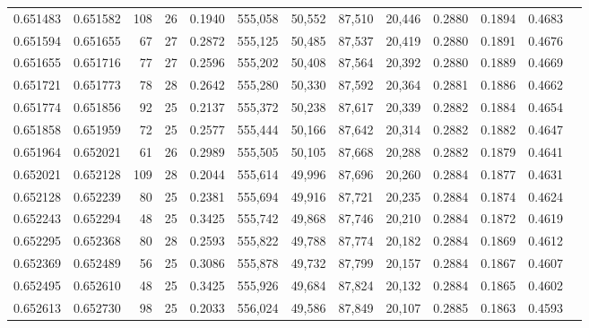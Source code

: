 \begin{tabular}{rrrrrrrrrrrrr}
0.651483 & 0.651582 & 108 &  26 &                                     0.1940 & 555,058 &  50,552 &  87,510 &  20,446 & 0.2880 & 0.1894 & 0.4683 \\
0.651594 & 0.651655 &  67 &  27 &                                     0.2872 & 555,125 &  50,485 &  87,537 &  20,419 & 0.2880 & 0.1891 & 0.4676 \\
0.651655 & 0.651716 &  77 &  27 &                                     0.2596 & 555,202 &  50,408 &  87,564 &  20,392 & 0.2880 & 0.1889 & 0.4669 \\
0.651721 & 0.651773 &  78 &  28 &                                     0.2642 & 555,280 &  50,330 &  87,592 &  20,364 & 0.2881 & 0.1886 & 0.4662 \\
0.651774 & 0.651856 &  92 &  25 &                                     0.2137 & 555,372 &  50,238 &  87,617 &  20,339 & 0.2882 & 0.1884 & 0.4654 \\
0.651858 & 0.651959 &  72 &  25 &                                     0.2577 & 555,444 &  50,166 &  87,642 &  20,314 & 0.2882 & 0.1882 & 0.4647 \\
0.651964 & 0.652021 &  61 &  26 &                                     0.2989 & 555,505 &  50,105 &  87,668 &  20,288 & 0.2882 & 0.1879 & 0.4641 \\
0.652021 & 0.652128 & 109 &  28 &                                     0.2044 & 555,614 &  49,996 &  87,696 &  20,260 & 0.2884 & 0.1877 & 0.4631 \\
0.652128 & 0.652239 &  80 &  25 &                                     0.2381 & 555,694 &  49,916 &  87,721 &  20,235 & 0.2884 & 0.1874 & 0.4624 \\
0.652243 & 0.652294 &  48 &  25 &                                     0.3425 & 555,742 &  49,868 &  87,746 &  20,210 & 0.2884 & 0.1872 & 0.4619 \\
0.652295 & 0.652368 &  80 &  28 &                                     0.2593 & 555,822 &  49,788 &  87,774 &  20,182 & 0.2884 & 0.1869 & 0.4612 \\
0.652369 & 0.652489 &  56 &  25 &                                     0.3086 & 555,878 &  49,732 &  87,799 &  20,157 & 0.2884 & 0.1867 & 0.4607 \\
0.652495 & 0.652610 &  48 &  25 &                                     0.3425 & 555,926 &  49,684 &  87,824 &  20,132 & 0.2884 & 0.1865 & 0.4602 \\
0.652613 & 0.652730 &  98 &  25 &                                     0.2033 & 556,024 &  49,586 &  87,849 &  20,107 & 0.2885 & 0.1863 & 0.4593 \\

\end{tabular}
